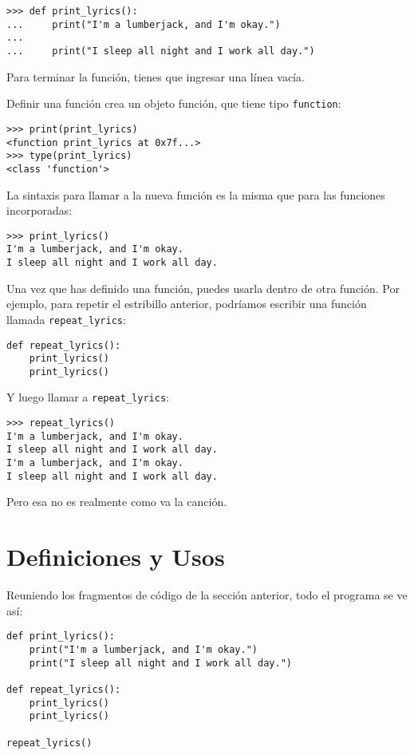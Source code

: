 \documentclass[12pt,letterpaper]{book}
\begin{document}
\begin{lstlisting}
>>> def print_lyrics():
...     print("I'm a lumberjack, and I'm okay.")
...     
...     print("I sleep all night and I work all day.")
\end{lstlisting}

Para terminar la función, tienes que ingresar una línea vacía.

Definir una función crea un objeto función, que tiene tipo \texttt{function}:

\begin{lstlisting}
>>> print(print_lyrics)
<function print_lyrics at 0x7f...>
>>> type(print_lyrics)
<class 'function'>
\end{lstlisting}

La sintaxis para llamar a la nueva función es la misma que para las funciones incorporadas:

\begin{lstlisting}
>>> print_lyrics()
I'm a lumberjack, and I'm okay.
I sleep all night and I work all day.
\end{lstlisting}

Una vez que has definido una función, puedes usarla dentro de otra función. Por ejemplo, para repetir el estribillo anterior, podríamos escribir una función llamada \texttt{repeat\_lyrics}:

\begin{lstlisting}
def repeat_lyrics():
    print_lyrics()
    print_lyrics()
\end{lstlisting}

Y luego llamar a \texttt{repeat\_lyrics}:

\begin{lstlisting}
>>> repeat_lyrics()
I'm a lumberjack, and I'm okay.
I sleep all night and I work all day.
I'm a lumberjack, and I'm okay.
I sleep all night and I work all day.
\end{lstlisting}

Pero esa no es realmente como va la canción.

\section{Definiciones y Usos}

Reuniendo los fragmentos de código de la sección anterior, todo el programa se ve así:

\begin{lstlisting}
def print_lyrics():
    print("I'm a lumberjack, and I'm okay.")
    print("I sleep all night and I work all day.")

def repeat_lyrics():
    print_lyrics()
    print_lyrics()

repeat_lyrics()
\end{lstlisting}
\end{document}
